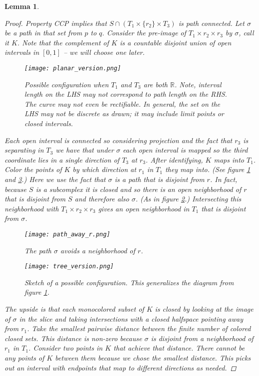 \documentclass[12pt,parskip=full]{report}
\theoremstyle{plain}
\newtheorem{lem}[thm]{Lemma}
\theoremstyle{definition}
\begin{document}
\begin{lem}
    \begin{proof}
        Property CCP implies that \(S \cap (T_{1} \times \{r_{2}\} \times T_{3} )\) is path connected. Let \(\sigma\) be a path in that set from \(p\) to \(q\). Consider the pre-image of \(T_{1} \times r_{2} \times r_{3}\) by \(\sigma\), call it \(K\). Note that the complement of \(K\) is a countable disjoint union of open intervals in \([0,1]\) -- we will choose one later.
\begin{figure}[htp]
    \centering
    \texttt{[image: planar\_version.png]}
    \caption{Possible configuration when $T_1$ and $T_3$ are both $\mathbb{R}$. Note, interval length on the LHS may not correspond to path length on the RHS. The curve may not even be rectifiable. In general, the set on the LHS may not be discrete as drawn; it may include limit points or closed intervals.}
    \label{fig:pathconfig}
\end{figure}
        Each open interval is connected so considering projection and the fact that \(r_{3}\) is separating in \(T_{3}\) we have that under \(\sigma\) each open interval is mapped so the third coordinate lies in a single direction of \(T_{3}\) at \(r_{3}\). After identifying, \(K\) maps into \(T_{1}\). Color the points of \(K\) by which direction at \(r_1\) in \(T_{1}\) they map into. (See figure \ref{fig:pathconfig} and \ref{fig:generaltree}.) Here we use the fact that \(\sigma\) is a path that is disjoint from \(r\). In fact, because \(S\) is a subcomplex it is closed and so there is an open neighborhood of \(r\) that is disjoint from \(S\) and therefore also  \(\sigma\). (As in figure \ref{fig:sigmaavoids}.) Intersecting this neighborhood with \(T_{1} \times r_{2} \times r_{3}\) gives an open neighborhood in \(T_{1}\) that is disjoint from \(\sigma\). 
\begin{figure}[!h]
    \centering
    \texttt{[image: path\_away\_r.png]}
    \caption{The path $\sigma$ avoids a neighborhood of $r$.}
    \label{fig:sigmaavoids}
\end{figure}
\begin{figure}[!h]
    \centering
    \texttt{[image: tree\_version.png]}
    \caption{Sketch of a possible configuration. This generalizes the diagram from figure \ref{fig:pathconfig}.}
    \label{fig:generaltree}
\end{figure}
        The upside is that each monocolored subset of \(K\) is closed by looking at the image of \(\sigma\) in the slice and taking intersections with a closed halfspace pointing away from \(r_{1}\). Take the smallest pairwise distance between the finite number of colored closed sets. This distance is non-zero because \(\sigma\) is disjoint from a neighborhood of $r_1$ in $T_1$. Consider two points in \(K\) that achieve that distance. There cannot be any points of \(K\) between them because we chose the smallest distance. This picks out an interval with endpoints that map to different directions as needed.
     \end{proof}
\end{lem}
\end{document}
